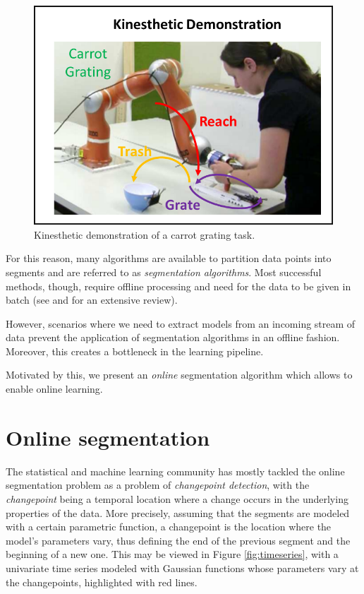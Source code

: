 \documentclass[11pt,twoside,a4paper]{report}
\begin{document}
\begin{figure}[h]
\centering
\includegraphics[width=.65\textwidth]{carrot_grating.png}
\caption{Kinesthetic demonstration of a carrot grating task.}
\label{fig:initial}
\end{figure}

For this reason, many algorithms are available to partition data points into segments and are referred to as \textit{segmentation algorithms}. Most successful methods, though, require offline processing and need for the data to be given in batch (see \cite{lucia} and \cite{nadia} for an extensive review).

However, scenarios where we need to extract models from an incoming stream of data prevent the application of segmentation algorithms in an offline fashion. Moreover, this creates a bottleneck in the learning pipeline.

Motivated by this, we present an \textit{online} segmentation algorithm which allows to enable online learning.

\section{Online segmentation}

The statistical and machine learning community has mostly tackled the online segmentation problem as a problem of \textit{changepoint detection}, with the \textit{changepoint} being a temporal location where a change occurs in the underlying properties of the data. More precisely, assuming that the segments are modeled with a certain parametric function, a changepoint is the location where the model's parameters vary, thus defining the end of the previous segment and the beginning of a new one. This may be viewed in Figure \ref{fig:timeseries}, with a univariate time series modeled with Gaussian functions whose parameters vary at the changepoints, highlighted with red lines.
\end{document}
